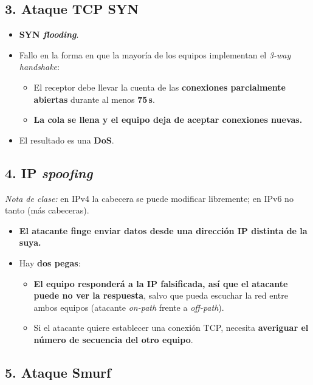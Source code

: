\documentclass[11pt,a4paper]{report}
\begin{document}
\subsection{3. Ataque TCP SYN}
 
\begin{itemize}
  \item \textbf{SYN \emph{flooding}}.
  \item Fallo en la forma en que la mayoría de los equipos implementan el \emph{3-way handshake}:
    \begin{itemize}
      \item El receptor debe llevar la cuenta de las \textbf{conexiones parcialmente abiertas} durante al menos \textbf{75\,s}.
      \item \textbf{La cola se llena y el equipo deja de aceptar conexiones nuevas.}
    \end{itemize}
  \item El resultado es una \textbf{DoS}.
\end{itemize}
 
\subsection{4. IP \emph{spoofing}}
 
\noindent\emph{Nota de clase:} en IPv4 la cabecera se puede modificar libremente; en IPv6 no tanto (más cabeceras).
 
\begin{itemize}
  \item \textbf{El atacante finge enviar datos desde una dirección IP distinta de la suya.}
  \item Hay \textbf{dos pegas}:
    \begin{itemize}
      \item \textbf{El equipo responderá a la IP falsificada, así que el atacante puede no ver la respuesta}, salvo que pueda escuchar la red entre ambos equipos (atacante \emph{on-path} frente a \emph{off-path}).
      \item Si el atacante quiere establecer una conexión TCP, necesita \textbf{averiguar el número de secuencia del otro equipo}.
    \end{itemize}
\end{itemize}
 
\subsection{5. Ataque Smurf}
 
\end{document}
